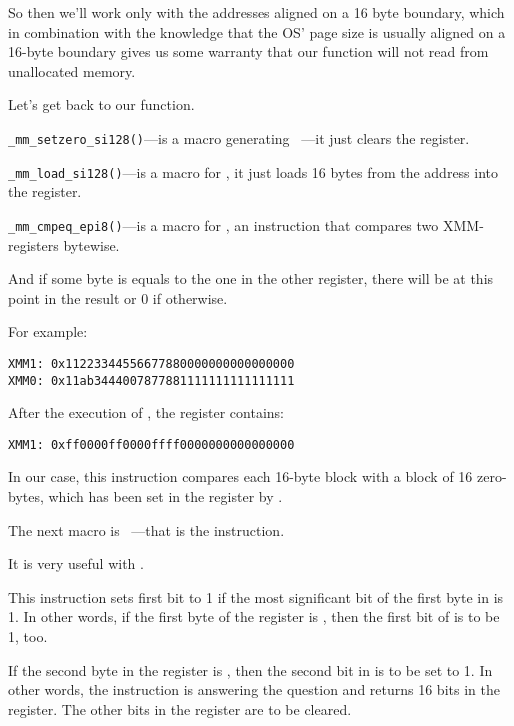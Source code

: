 So then we'll work only with the addresses aligned on a 16 byte boundary, which in combination with the knowledge
that the \ac{OS}' page size is usually aligned on a 16-byte boundary gives us some warranty that our function will not
read from unallocated memory.

Let's get back to our function.

\verb|_mm_setzero_si128()|---is a macro generating ~---it just clears the  register.

\verb|_mm_load_si128()|---is a macro for \MOVDQA, it just loads 16 bytes from the address into the  register.

\verb|_mm_cmpeq_epi8()|---is a macro for \PCMPEQB, an instruction that compares two XMM-registers bytewise.

And if some byte is equals to the one in the other register, 
there will be  at this point in the result or 0 if otherwise.

For example:

\begin{verbatim}
XMM1: 0x11223344556677880000000000000000
XMM0: 0x11ab3444007877881111111111111111
\end{verbatim}

After the execution of , the  register contains:

\begin{verbatim}
XMM1: 0xff0000ff0000ffff0000000000000000
\end{verbatim}

In our case, this instruction compares each 16-byte block with a block of 16 zero-bytes,
which has been set in the  register by .


The next macro is ~---that is the  instruction.

It is very useful with \PCMPEQB.


This instruction sets first \EAX bit to 1 if the most significant bit of the first byte in  is 1.
In other words, if the first byte of the  register is , then the first bit of \EAX is to be 1, too.

If the second byte in the  register is , then the second bit in \EAX is to be set to 1.
In other words, the instruction is answering the question 
and returns 16 bits in the \EAX register. 
The other bits in the \EAX register are to be cleared.

